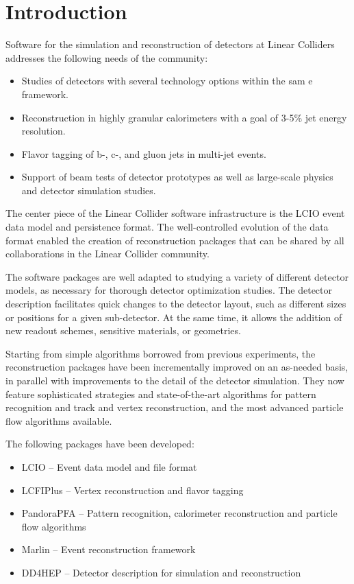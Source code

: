 \section{Introduction}
Software for the simulation and reconstruction of detectors at Linear Colliders addresses the following needs of the community:
\begin{itemize}
	\item Studies of detectors with several technology options within the sam e framework.
	\item Reconstruction in highly granular calorimeters with a goal of 3-5\% jet energy resolution.
	\item Flavor tagging of b-, c-, and gluon jets in multi-jet events.
	\item Support of beam tests of detector prototypes as well as large-scale physics and detector simulation studies.
\end{itemize}

The center piece of the Linear Collider software infrastructure is the LCIO event data model and persistence format. The well-controlled evolution of the data format enabled the creation of reconstruction packages that can be shared by all collaborations in the Linear Collider community.

The software packages are well adapted to studying a variety of different detector models, as necessary for thorough detector optimization studies. The detector description facilitates quick changes to the detector layout, such as different sizes or positions for a given sub-detector. At the same time, it allows the addition of new readout schemes, sensitive materials, or geometries.

Starting from simple algorithms borrowed from previous experiments, the reconstruction packages have been incrementally improved on an as-needed basis, in parallel with improvements to the detail of the detector simulation. They now feature sophisticated strategies and state-of-the-art algorithms for pattern recognition and track and vertex reconstruction, and the most advanced particle flow algorithms available.

The following packages have been developed:
\begin{itemize}
	\item LCIO -- Event data model and file format
	\item LCFIPlus -- Vertex reconstruction and flavor tagging
	\item PandoraPFA -- Pattern recognition, calorimeter reconstruction and particle flow algorithms
	\item Marlin -- Event reconstruction framework
	\item DD4HEP -- Detector description for simulation and reconstruction
\end{itemize}
